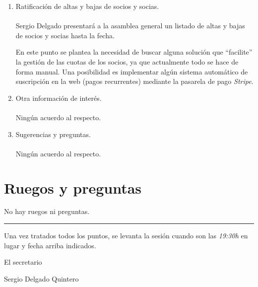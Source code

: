 \documentclass[a4paper, 12pt]{article}
\begin{document}
\begin{enumerate}
    \item Ratificación de altas y bajas de socios y socias. \\ \\
    Sergio Delgado presentará a la asamblea general un listado de altas y bajas de socios y socias hasta la fecha.

    En este punto se plantea la necesidad de buscar alguna solución que ``facilite'' la gestión de las cuotas de los socios, ya que actualmente todo se hace de forma manual. Una posibilidad es implementar algún sistema automático de suscripción en la web (pagos recurrentes) mediante la pasarela de pago \textit{Stripe}.

    \item Otra información de interés. \\ \\
    Ningún acuerdo al respecto.

    \item Sugerencias y preguntas. \\ \\
    Ningún acuerdo al respecto.
\end{enumerate}

\section{Ruegos y preguntas}

No hay ruegos ni preguntas.


\vspace{1cm}
\hrule
\vspace{3mm}

Una vez tratados todos los puntos, se levanta la sesión cuando son las \textit{19:30h} en lugar y fecha arriba indicados.

\begin{flushright}
El secretario

Sergio Delgado Quintero
\end{flushright}
\end{document}
